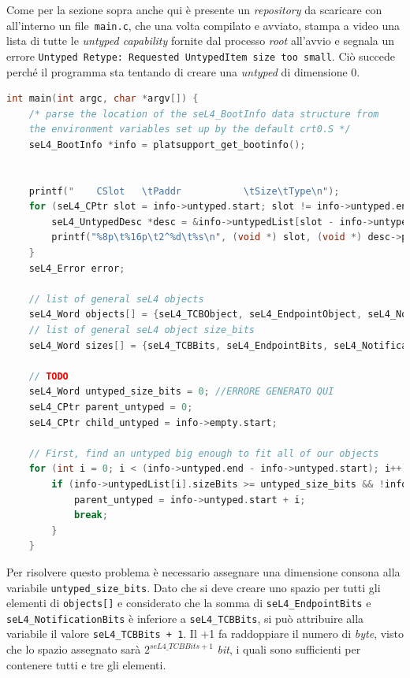 Come per la sezione sopra anche qui è presente un \textit{repository} da scaricare con all'interno un file\texttt{ main.c}, che una volta compilato e avviato, stampa a video una lista di tutte le \textit{untyped capability} fornite dal processo \textit{root} all'avvio e segnala un errore \texttt{Untyped Retype: Requested UntypedItem size too small}. Ciò succede perché il programma sta tentando di creare una \textit{untyped} di dimensione 0.
\begin{lstlisting}[language=C++]
int main(int argc, char *argv[]) {
    /* parse the location of the seL4_BootInfo data structure from
    the environment variables set up by the default crt0.S */
    seL4_BootInfo *info = platsupport_get_bootinfo();


    printf("    CSlot   \tPaddr           \tSize\tType\n");
    for (seL4_CPtr slot = info->untyped.start; slot != info->untyped.end; slot++) {
        seL4_UntypedDesc *desc = &info->untypedList[slot - info->untyped.start];
        printf("%8p\t%16p\t2^%d\t%s\n", (void *) slot, (void *) desc->paddr, desc->sizeBits, desc->isDevice ? "device untyped" : "untyped");
    }
    seL4_Error error;

    // list of general seL4 objects
    seL4_Word objects[] = {seL4_TCBObject, seL4_EndpointObject, seL4_NotificationObject};
    // list of general seL4 object size_bits
    seL4_Word sizes[] = {seL4_TCBBits, seL4_EndpointBits, seL4_NotificationBits};
    
    // TODO
    seL4_Word untyped_size_bits = 0; //ERRORE GENERATO QUI
    seL4_CPtr parent_untyped = 0;
    seL4_CPtr child_untyped = info->empty.start;

    // First, find an untyped big enough to fit all of our objects
    for (int i = 0; i < (info->untyped.end - info->untyped.start); i++) {
        if (info->untypedList[i].sizeBits >= untyped_size_bits && !info->untypedList[i].isDevice) {
            parent_untyped = info->untyped.start + i;
            break;
        }
    }
\end{lstlisting}

Per risolvere questo problema è necessario assegnare una dimensione consona alla variabile \texttt{untyped\_size\_bits}. Dato che si deve creare uno spazio per tutti gli elementi di \texttt{objects[]} e considerato che la somma di \texttt{seL4\_EndpointBits} e \texttt{seL4\_NotificationBits} è inferiore a \texttt{seL4\_TCBBits}, si può attribuire alla variabile il valore \texttt{seL4\_TCBBits + 1}. Il +1 fa raddoppiare il numero di \textit{byte}, visto che lo spazio assegnato sarà $ 2^{seL4\_TCBBits + 1} $ \textit{bit}, i quali sono sufficienti per contenere tutti e tre gli elementi.

